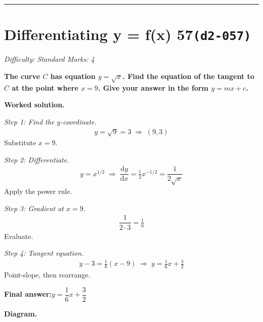 \documentclass[11pt]{article}
\newcommand{\question}[1]{\par\medskip\noindent\textbf{#1}\par}
\begin{document}
\medskip\hrule

\section*{Differentiating y = f(x) 57\quad\small\texttt{(d2-057)}}
\textit{Difficulty: Standard \quad\textbar\quad Marks: 4}

\question{The curve \( C \) has equation \( y = \sqrt{x} \). Find the equation of the tangent to \( C \) at the point where \( x = 9 \). Give your answer in the form \( y = mx + c \).}

\textbf{Worked solution.}

\textit{Step 1: Find the \( y \)-coordinate.}
\[\begin{gathered}
y = \sqrt{9} = 3 \;\Rightarrow\; (9, 3)
\end{gathered}\]
Substitute \( x = 9 \).

\textit{Step 2: Differentiate.}
\[\begin{gathered}
y = x^{1/2} \;\Rightarrow\; \dfrac{\mathrm{d}y}{\mathrm{d}x} = \tfrac{1}{2}x^{-1/2} = \dfrac{1}{2\sqrt{x}}
\end{gathered}\]
Apply the power rule.

\textit{Step 3: Gradient at \( x = 9 \).}
\[\begin{gathered}
\dfrac{1}{2 \cdot 3} = \tfrac{1}{6}
\end{gathered}\]
Evaluate.

\textit{Step 4: Tangent equation.}
\[\begin{gathered}
y - 3 = \tfrac{1}{6}(x - 9) \;\Rightarrow\; y = \tfrac{1}{6}x + \tfrac{3}{2}
\end{gathered}\]
Point-slope, then rearrange.

\begin{answerbox}
\textbf{Final answer:}\quad \(\displaystyle  y = \dfrac{1}{6}x + \dfrac{3}{2} \)
\end{answerbox}
\textbf{Diagram.}
\end{document}
